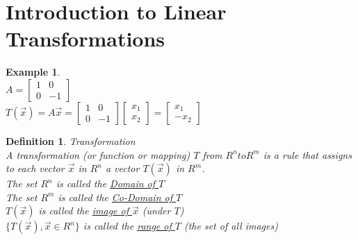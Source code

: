 \documentclass[a4paper,12pt,openany]{book}
\theoremstyle{defn}
\newtheorem{defn}{Definition}[section]
\theoremstyle{expl}
\newtheorem{expl}{Example}[section]
\begin{document}
\section{Introduction to Linear Transformations}
\begin{expl}\-\\
\textup{
$A = \left[\begin{array}{cc}1&0\\0&-1\end{array}\right]$\\
$T(\vec{x})=A\vec{x}=\left[\begin{array}{cc}1&0\\0&-1\end{array}\right]\left[\begin{array}{c}x_1\\x_2\end{array}\right]=\left[\begin{array}{c}x_1\\-x_2\end{array}\right]$\\
}\end{expl}
\begin{defn}
\textup{
Transformation\\
A transformation (or function or mapping) $T$ from $R^n to R^m$ is a rule that assigns to each vector $\vec{x}$ in $R^n$ a vector $T(\vec{x})$ in $R^m$.\\
The set $R^n$ is called the \underline{Domain of $T$}\\
The set $R^m$ is called the \underline{Co-Domain of $T$}\\
$T(\vec{x})$ is called the \underline{image of $\vec{x}$} (under $T$)\\
$\{T(\vec{x}),\vec{x}\in R^n\}$ is called the \underline{range of $T$} (the set of all images)\\
}
\end{defn}
\end{document}
